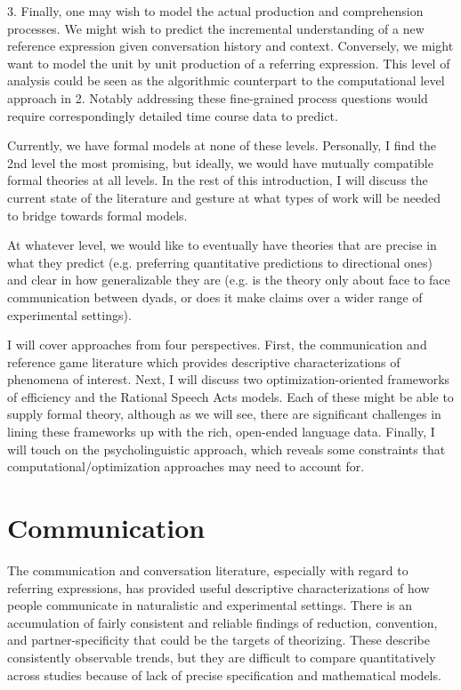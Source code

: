 \documentclass[]{article}
\begin{document}
	3. Finally, one may wish to model the actual production and comprehension processes. We might wish to predict the incremental understanding of a new reference expression given conversation history and context. Conversely, we might want to model the unit by unit production of a referring expression. This level of analysis could be seen as the algorithmic counterpart to the computational level approach in 2. Notably addressing these fine-grained process questions would require correspondingly detailed time course data to predict. 
	
	
	
	Currently, we have formal models at none of these levels. Personally, I find the 2nd level the most promising, but ideally, we would have mutually compatible formal theories at all levels. In the rest of this introduction, I will discuss the current state of the literature and gesture at what types of work will be needed to bridge towards formal models. 
	
		At whatever level, we would like to eventually have theories that are precise in what they predict (e.g. preferring quantitative predictions to directional ones) and clear in how generalizable they are (e.g. is the theory only about face to face communication between dyads, or does it make claims over a wider range of experimental settings). 
		
	I will cover approaches from four perspectives. First, the communication and reference game literature which provides descriptive characterizations of phenomena of interest. Next, I will discuss two optimization-oriented frameworks of efficiency and the Rational Speech Acts models. Each of these might be able to supply formal theory, although as we will see, there are significant challenges in lining these frameworks up with the rich, open-ended language data. Finally, I will touch on the psycholinguistic approach, which reveals some constraints that computational/optimization approaches may need to account for. 
	


\section{Communication}

The communication and conversation literature, especially with regard to referring expressions, has provided useful descriptive characterizations of how people communicate in naturalistic and experimental settings. There is an accumulation of fairly consistent and reliable findings of reduction, convention, and partner-specificity that could be the targets of theorizing. These describe consistently observable trends, but they are difficult to compare quantitatively across studies because of lack of precise specification and mathematical models.
\end{document}
